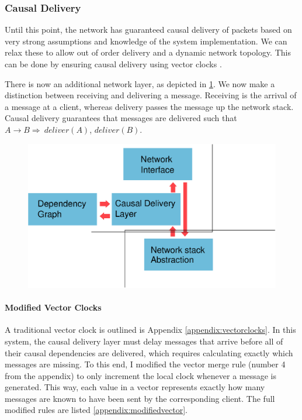 \documentclass[12pt,a4paper,twoside,openright]{report}
\begin{document}
		
		\subsubsection{Causal Delivery}
		Until this point, the network has guaranteed causal delivery of packets based on very strong assumptions and knowledge of the system implementation. We can relax these to allow out of order delivery and a dynamic network topology. This can be done by ensuring causal delivery using vector clocks \cite{fidge1987}.
		
		There is now an additional network layer, as depicted in \ref{fig:causal}. We now make a distinction between receiving and delivering a message. Receiving is the arrival of a message at a client, whereas delivery passes the message up the network stack. Causal delivery guarantees that messages are delivered such that $A \rightarrow B \Rightarrow\ deliver(A)$, $deliver(B)$.
		
				
	\begin{figure}[H]
	\centering
	\includegraphics[width=1\linewidth]{figs/causal_arch.eps}
	\caption[Ensuring Causal Delivery]{}
	\label{fig:causal}
	\end{figure}

	
		\paragraph{Modified Vector Clocks} \label{sec:modifiedvectors}
		A traditional vector clock is outlined is Appendix \ref{appendix:vectorclocks}. In this system, the causal delivery layer must delay messages that arrive before all of their causal dependencies are delivered, which requires calculating exactly which messages are missing. To this end, I modified the vector merge rule (number 4 from the appendix) to only increment the local clock whenever a message is generated. This way, each value in a vector represents exactly how many messages are known to have been sent by the corresponding client. The full modified rules are listed \cref{appendix:modifiedvector}.
		
\end{document}
